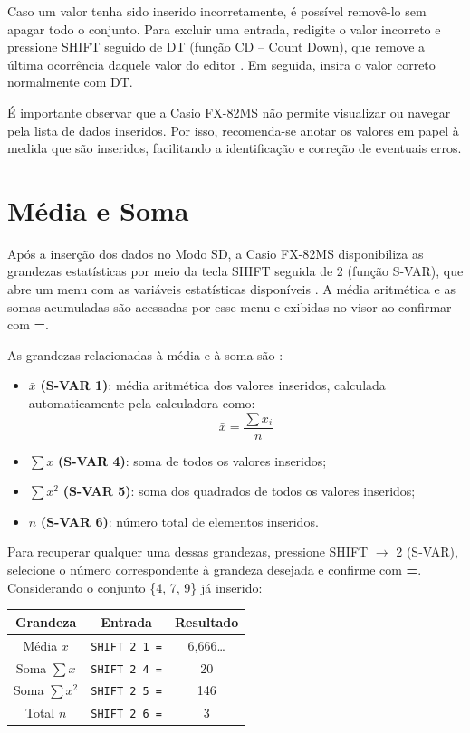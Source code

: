 Caso um valor tenha sido inserido incorretamente, é possível removê-lo sem apagar todo o conjunto. Para excluir uma entrada, redigite o valor incorreto e pressione SHIFT seguido de DT (função CD -- Count Down), que remove a última ocorrência daquele valor do editor \cite{casio2004}. Em seguida, insira o valor correto normalmente com DT.

É importante observar que a Casio FX-82MS não permite visualizar ou navegar pela lista de dados inseridos. Por isso, recomenda-se anotar os valores em papel à medida que são inseridos, facilitando a identificação e correção de eventuais erros.

\section{Média e Soma}

Após a inserção dos dados no Modo SD, a Casio FX-82MS disponibiliza as grandezas estatísticas por meio da tecla SHIFT seguida de
2 (função S-VAR), que abre um menu com as variáveis estatísticas disponíveis \cite{casio2004}. A média aritmética e as somas acumuladas são acessadas por esse menu e exibidas no visor ao confirmar com \textbf{=}.

As grandezas relacionadas à média e à soma são \cite{casio2004}:

\begin{itemize}
    \item $\bar{x}$ \textbf{(S-VAR 1)}: média aritmética dos valores inseridos, calculada automaticamente pela calculadora como:
    \[
        \bar{x} = \frac{\sum x_i}{n}
    \]
    \item $\sum x$ \textbf{(S-VAR 4)}: soma de todos os valores inseridos;
    \item $\sum x^2$ \textbf{(S-VAR 5)}: soma dos quadrados de todos os valores inseridos;
    \item $n$ \textbf{(S-VAR 6)}: número total de elementos inseridos.
\end{itemize}

Para recuperar qualquer uma dessas grandezas, pressione SHIFT $\to$ 2 (S-VAR), selecione o número correspondente à grandeza desejada e confirme com \textbf{=}. Considerando o conjunto \{4, 7, 9\} já inserido:

\begin{table}[H]
    \centering
    \begin{tabular}{|c|c|c|}
        \hline
        \textbf{Grandeza} & \textbf{Entrada} & \textbf{Resultado} \\ \hline
        Média $\bar{x}$ & \texttt{SHIFT 2 1 =} & 6{,}666\ldots \\
        Soma $\sum x$ & \texttt{SHIFT 2 4 =} & 20 \\
        Soma $\sum x^2$ & \texttt{SHIFT 2 5 =} & 146 \\
        Total $n$ & \texttt{SHIFT 2 6 =} & 3 \\ \hline
    \end{tabular}
\end{table}

